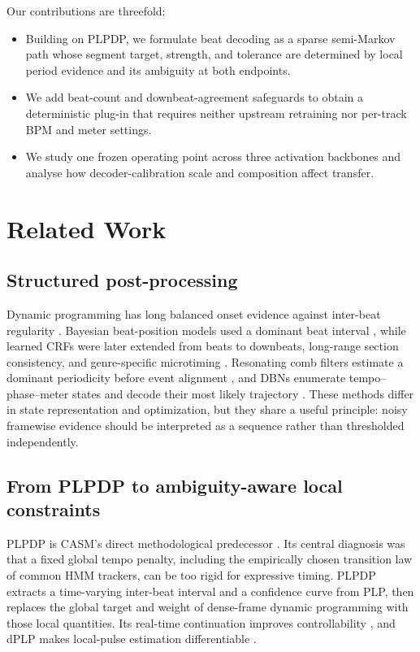 \documentclass{article}
\begin{document}
Our contributions are threefold:
\begin{itemize}
\item Building on PLPDP, we formulate beat decoding as a sparse semi-Markov
path whose segment target, strength, and tolerance are determined by local
period evidence and its ambiguity at both endpoints.
\item We add beat-count and downbeat-agreement safeguards to obtain a
deterministic plug-in that requires neither upstream retraining nor per-track
BPM and meter settings.
\item We study one frozen operating point across three activation backbones and
analyse how decoder-calibration scale and composition affect transfer.
\end{itemize}

\section{Related Work}
\label{sec:related}

\subsection{Structured post-processing}

Dynamic programming has long balanced onset evidence against inter-beat
regularity \cite{ellis2007beattracking}. Bayesian beat-position models used a
dominant beat interval \cite{korzeniowski2014crf}, while learned CRFs were later
extended from beats to downbeats, long-range section consistency, and
genre-specific microtiming \cite{fillon2015crf,durand2016crfdownbeat,
fuentes2019skipchain,fuentes2019microtiming}. Resonating comb filters estimate a
dominant periodicity before event alignment \cite{bock2015combfilter}, and DBNs
enumerate tempo--phase--meter states and decode their most likely trajectory
\cite{krebs2015dbn,bock2016joint}. These methods differ in state representation
and optimization, but they share a useful principle: noisy framewise evidence
should be interpreted as a sequence rather than thresholded independently.

\subsection{From PLPDP to ambiguity-aware local constraints}

PLPDP is CASM's direct methodological predecessor
\cite{chiu2023localperiodicity}. Its central diagnosis was that a fixed global
tempo penalty, including the empirically chosen transition law of common HMM
trackers, can be too rigid for expressive timing. PLPDP extracts a time-varying
inter-beat interval and a confidence curve from PLP, then replaces the global
target and weight of dense-frame dynamic programming with those local
quantities. Its real-time continuation improves controllability
\cite{meier2024realtime}, and dPLP makes local-pulse estimation differentiable
\cite{chiu2025dplp}.
\end{document}
